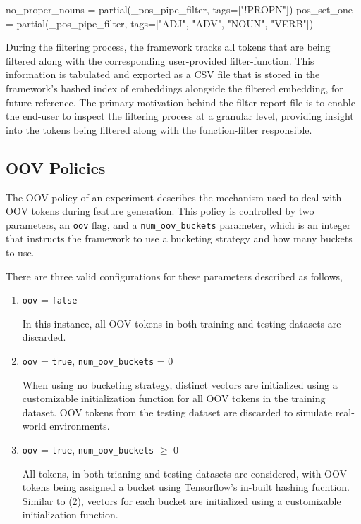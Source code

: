 \documentclass[12pt, a4paper]{report}
\newenvironment{code}
{\footnotesize\verbatim}{\endverbatim\normalfont}
\theoremstyle{definition}
\theoremstyle{definition}%
\theoremstyle{definition}%
\theoremstyle{definition}%
\theoremstyle{definition}%
\theoremstyle{definition}%
\begin{document}
\begin{code}
no_proper_nouns = partial(_pos_pipe_filter, tags=["!PROPN"])
pos_set_one = partial(_pos_pipe_filter, tags=["ADJ", "ADV", "NOUN", "VERB"])
\end{code}

During the filtering process, the framework tracks all tokens that are being filtered along with the corresponding user-provided filter-function. This information is tabulated and exported as a CSV file that is stored in the framework's hashed index of embeddings alongside the filtered embedding, for future reference. The primary motivation behind the filter report file is to enable the end-user to inspect the filtering process at a granular level, providing insight into the tokens being filtered along with the function-filter responsible.

\subsection{OOV Policies}
The OOV policy of an experiment describes the mechanism used to deal with OOV tokens during feature generation. This policy is controlled by two parameters, an \texttt{oov} flag, and a \texttt{num\_oov\_buckets} parameter, which is an integer that instructs the framework to use a bucketing strategy and how many buckets to use.

There are three valid configurations for these parameters described as follows, 

\begin{enumerate}
\item \texttt{oov} = \texttt{false} 

In this instance, all OOV tokens in both training and testing datasets are discarded.

\item \texttt{oov} = \texttt{true}, \texttt{num\_oov\_buckets} = 0

When using no bucketing strategy, distinct vectors are initialized using a customizable initialization function for all OOV tokens in the training dataset. OOV tokens from the testing dataset are discarded to simulate real-world environments.

\item \texttt{oov} = \texttt{true}, \texttt{num\_oov\_buckets} $\geqslant$ 0

All tokens, in both trianing and testing datasets are considered, with OOV tokens being assigned a bucket using Tensorflow's in-built hashing fucntion. Similar to (2), vectors for each bucket are initialized using a customizable initialization function.
\end{enumerate}
\end{document}
